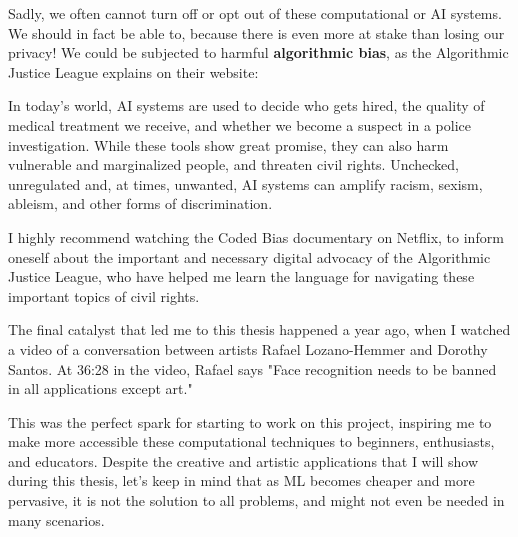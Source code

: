 Sadly, we often cannot turn off or opt out of these computational or \acrshort{AI} systems. We should in fact be able to, because there is even more at stake than losing our privacy! We could be subjected to harmful \textbf{algorithmic bias}, as the Algorithmic Justice League explains on their website:

\begin{displayquote}
In today’s world, AI systems are used to decide who gets hired, the quality of medical treatment we receive, and whether we become a suspect in a police investigation. While these tools show great promise, they can also harm vulnerable and marginalized people, and threaten civil rights. Unchecked, unregulated and, at times, unwanted, AI systems can amplify racism, sexism, ableism, and other forms of discrimination.\cite{website-algorithmic-justice-league}
\end{displayquote}

I highly recommend watching the Coded Bias documentary on Netflix, to inform oneself about the important and necessary digital advocacy of the Algorithmic Justice League, who have helped me learn the language for navigating these important topics of civil rights.

The final catalyst that led me to this thesis happened a year ago, when I watched a video \cite{website-talk-technology-and-public-art-rafael-lozano-hemmer} of a conversation between artists Rafael Lozano-Hemmer and Dorothy Santos. At 36:28 in the video, Rafael says "Face recognition needs to be banned in all applications except art."

This was the perfect spark for starting to work on this project, inspiring me to make more accessible these computational techniques to beginners, enthusiasts, and educators. Despite the creative and artistic applications that I will show during this thesis, let's keep in mind that as \acrshort{ML} becomes cheaper and more pervasive, it is not the solution to all problems, and might not even be needed in many scenarios.

